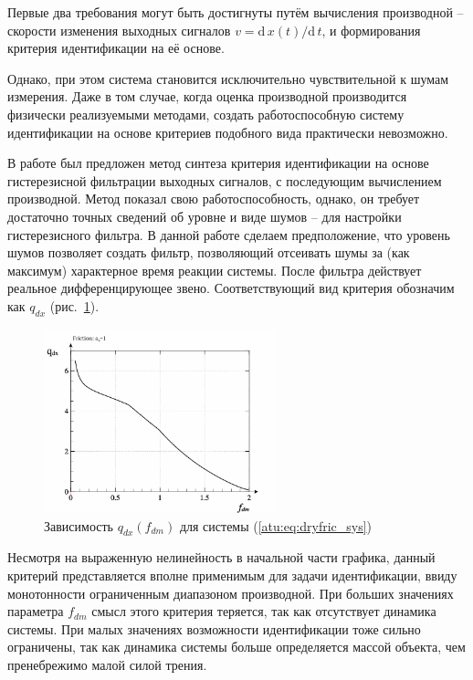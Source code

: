 Первые два требования
могут быть достигнуты путём вычисления производной --
скорости изменения выходных сигналов
\(v = \mathrm{d}\,x(t)/ \mathrm{d}\,t \),
и формирования критерия идентификации на её основе.

Однако, при этом система становится исключительно чувствительной
к шумам измерения. Даже в том случае, когда
оценка производной производится физически реализуемыми методами,
создать работоспособную систему идентификации на основе критериев
подобного вида практически невозможно.

В работе \cite{atu_asau11} был предложен метод синтеза критерия идентификации
на основе гистерезисной фильтрации выходных сигналов, с последующим
вычислением производной. Метод показал свою работоспособность, однако,
он требует достаточно точных сведений об уровне и виде шумов -- для
настройки гистерезисного фильтра. В данной работе сделаем предположение,
что уровень шумов позволяет создать фильтр, позволяющий отсеивать шумы
за (как максимум) характерное время реакции системы.
После фильтра действует реальное дифференцирующее звено.
Соответствующий вид критерия обозначим как $ q_{dx} $ (рис.~\ref{atu:f:fric_q}).



\begin{figure}[htb!]
\centerline{
  \includegraphics[width=0.60\textwidth]{p/cha/fric/fric_q-p_f_dm_q.png}
}
  \caption{Зависимость $q_{dx}(f_{dm})$ для системы (\ref{atu:eq:dryfric_sys}) }
\label{atu:f:fric_q}
\end{figure}

Несмотря на выраженную нелинейность в начальной части графика,
данный критерий представляется вполне применимым для задачи идентификации,
ввиду монотонности ограниченным диапазоном производной.
При больших значениях параметра $f_{dm}$ смысл этого критерия теряется,
так как отсутствует динамика системы. При малых значениях возможности идентификации
тоже сильно ограничены, так как динамика системы больше определяется
массой объекта, чем пренебрежимо малой силой трения.

